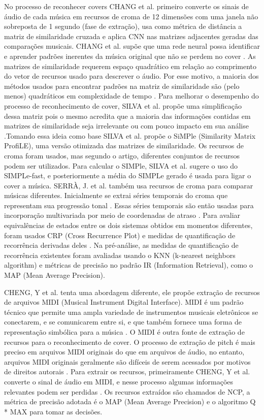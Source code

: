 No processo de reconhecer covers CHANG et al. primeiro converte os sinais de áudio de cada música em recursos de croma de 12 dimensões com uma janela não sobreposta de 1 segundo (fase de extração), usa como métrica de distância a matriz de similaridade cruzada e aplica CNN nas matrizes adjacentes geradas das comparações musicais. CHANG et al. supõe que uma rede neural possa identificar e aprender padrões inerentes da música original que não se perdem no cover \cite{Chang2017}. As matrizes de similaridade requerem espaço quadrático em relação ao comprimento do vetor de recursos usado para descrever o áudio. Por esse motivo, a maioria dos métodos usados para encontrar padrões na matriz de similaridade são (pelo menos) quadráticos em complexidade de tempo \cite{8392419}. Para melhorar o desempenho do processo de reconhecimento de cover, SILVA et al. propõe uma simplificação dessa matriz pois o mesmo acredita que a maioria das informações contidas em matrizes de similaridade seja irrelevante ou com pouco impacto em sua análise \cite{8392419}.Tomando essa ideia como base SILVA et al. propõe o SiMPle (Similarity Matrix ProfiLE), uma versão otimizada das matrizes de similaridade. Os recursos de croma foram usados, mas segundo o artigo, diferentes conjuntos de recursos podem ser utilizados. Para calcular o SIMPle, SILVA et al. sugere o uso do SIMPLe-fast, e posteriormente a média do SIMPLe gerado é usada para ligar o cover a música. SERRÀ, J. et al. também usa recursos de croma para comparar músicas diferentes. Inicialmente se extrai séries temporais do croma que representam sua progressão tonal \cite{Serra2009}. Essas séries temporais são então usadas para incorporação multivariada por meio de coordenadas de atraso \cite{Serra2009}. Para avaliar equivalências de estados entre os dois sistemas obtidos em momentos diferentes, foram usados CRP (Cross Recurrence Plot) e medidas de quantificação de recorrência derivadas deles \cite{Serra2009}. Na pré-análise, as medidas de quantificação de recorrência existentes foram avaliadas usando o KNN (k-nearest neighbors algorithm) \cite{Serra2009} e métricas de precisão no padrão IR (Information Retrieval), como o MAP (Mean Average Precision).

CHENG, Y et al. tenta uma abordagem diferente, ele propõe extração de recursos de arquivos MIDI (Musical Instrument Digital Interface). MIDI é um padrão técnico que permite uma ampla variedade de instrumentos musicais eletrônicos se conectarem, e se comunicarem entre si, e que também fornece uma forma de representação simbólica para a música \cite{10.1145/3077136.3080680}. O MIDI é outra fonte de extração de recursos para o reconhecimento de cover. O processo de extração de pitch é mais preciso em arquivos MIDI originais do que em arquivos de áudio, no entanto, arquivos MIDI originais geralmente são difíceis de serem acessados por motivos de direitos autorais \cite{10.1145/3077136.3080680}. Para extrair os recursos, primeiramente CHENG, Y et al. converte o sinal de áudio em MIDI, e nesse processo algumas informações relevantes podem ser perdidas \cite{10.1145/3077136.3080680}. Os recursos extraídos são chamados de NCP, a métrica de precisão adotada é o MAP (Mean Average Precision) e o algoritmo Q * MAX para tomar as decisões. 

